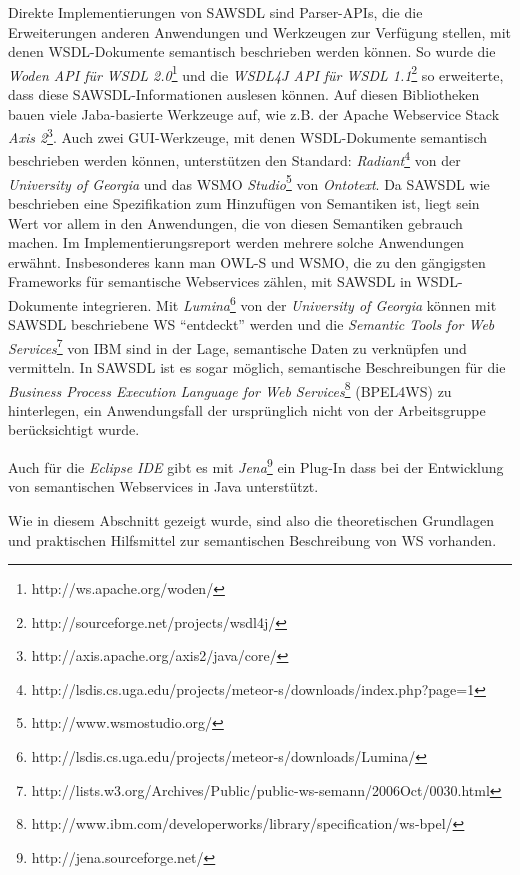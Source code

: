Direkte Implementierungen von \ac{SAWSDL} sind Parser-\ac{API}s, die die Erweiterungen anderen Anwendungen und Werkzeugen zur Verfügung stellen, mit denen \ac{WSDL}-Dokumente semantisch beschrieben werden können. So wurde die \emph{Woden API für WSDL 2.0}\footnote{http://ws.apache.org/woden/} und die \emph{WSDL4J API für WSDL
1.1}\footnote{http://sourceforge.net/projects/wsdl4j/} so erweiterte, dass diese \ac{SAWSDL}-Informationen auslesen können. Auf diesen Bibliotheken bauen viele Jaba-basierte Werkzeuge auf, wie z.B. der Apache Webservice Stack \emph{Axis 2}\footnote{http://axis.apache.org/axis2/java/core/}. Auch zwei GUI-Werkzeuge, mit denen \ac{WSDL}-Dokumente semantisch beschrieben werden können, unterstützen den Standard: \emph{Radiant}\footnote{http://lsdis.cs.uga.edu/projects/meteor-s/downloads/index.php?page=1} von der \emph{University of Georgia} und das \acl{WSMO} \emph{Studio}\footnote{http://www.wsmostudio.org/} von \emph{Ontotext}. Da \ac{SAWSDL} wie beschrieben eine Spezifikation zum Hinzufügen von Semantiken ist, liegt sein Wert vor allem in den Anwendungen, die von diesen Semantiken gebrauch machen. Im Implementierungsreport werden mehrere solche Anwendungen erwähnt.
Insbesonderes kann man \ac{OWL-S} und \ac{WSMO}, die zu den gängigsten Frameworks für semantische Webservices zählen,  mit \ac{SAWSDL} in \ac{WSDL}-Dokumente integrieren. Mit \emph{Lumina}\footnote{http://lsdis.cs.uga.edu/projects/meteor-s/downloads/Lumina/} von der \emph{University of Georgia} können mit \ac{SAWSDL} beschriebene \acl{WS} "`entdeckt"' werden und die \emph{Semantic Tools for Web Services}\footnote{http://lists.w3.org/Archives/Public/public-ws-semann/2006Oct/0030.html} von IBM sind in der Lage, semantische Daten zu verknüpfen und vermitteln.
In \ac{SAWSDL} ist es sogar möglich, semantische Beschreibungen für die \emph{Business Process Execution Language for Web Services}\footnote{http://www.ibm.com/developerworks/library/specification/ws-bpel/} (BPEL4WS) zu hinterlegen, ein Anwendungsfall der ursprünglich nicht von der Arbeitsgruppe berücksichtigt wurde. \cite[S.63]{ky-sawsdl}

Auch für die \emph{Eclipse IDE} gibt es mit \emph{Jena}\footnote{http://jena.sourceforge.net/} ein Plug-In dass bei der Entwicklung von semantischen Webservices in Java unterstützt.

Wie in diesem Abschnitt gezeigt wurde, sind also die theoretischen Grundlagen und praktischen Hilfsmittel zur semantischen Beschreibung von \acl{WS} vorhanden.



